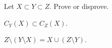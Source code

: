 \item Let $X \subset Y \subset Z$. Prove or disprove.
\ba
\item $C_Y(X) \subset C_Z(X)$.

\item $Z \setminus (Y \setminus X) = X \cup (Z \setminus Y)$. 


\ea

\begin{comment}

\ExerciseSolution

\ba
\item  To prove this containment, we choose an arbitrary element from $C_Y(X)$ and show that the element is also in $C_Z(X)$. Suppose $t \in C_Y(X)$. Then $t \in Y$ but $t \not\in X$. Since $Y \subset Z$, it follows that $t \in Z$. So $t \in Z$ but $t \notin X$. This means $t \in C_Z(X)$. We conclude that $C_Y(X) \subset C_Z(X)$.

\item  To prove $Z \setminus (Y \setminus X) \subseteq X \cup (Z \setminus Y)$, suppose that $t \in Z \setminus (Y \setminus X)$. By definition, $t \in Z$ but $t \notin (Y\setminus X)$. So $t \in X$ or $t \notin Y$. This gives us two possibilities: $t \in Z$ and $t \in X$ or $t \in Z$ and $t \notin Y$. 
\begin{itemize}
\item If $t \in X$ and $t \in Z$, then $X \subset Z$ implies $t \in X$. 
\item If $t \in Z$ and $t \notin Y$, then $t \in Z\setminus Y$. 
\end{itemize}
Thus, we either have $t \in X$ or $t \in Z\setminus Y$. This is the same as saying $t \in X \cup (Z\setminus Y)$. So  $Z \setminus (Y\setminus X) \subseteq X \cup (Z\setminus Y)$.

For the reverse containment, suppose $t \in X \cup (Z\setminus Y)$. Then $t \in X$ or $t \in Z\setminus Y$. We consider the cases.  
\begin{itemize}
\item Suppose $t \in X$. Then $X \subseteq Z$ implies $t \in Z$. The fact that $t \in X$ means that $t \notin Y\setminus X$. Thus, $t \in Z \setminus (Y\setminus X)$.
\item Now suppose that $t \in Z\setminus Y$. Since $Z\setminus Y \subseteq Z$, it follows that $t \in Z$. The facts that $Y\setminus X \subseteq Y$ and $t \notin Y$ also show that $t \notin Y\setminus X$. Thus, $t \in Z \setminus (Y\setminus X)$. 
\end{itemize}
In either case we have $t \in Z \setminus (Y\setminus X)$, and so $X \cup (Z\setminus Y) \subseteq Z \setminus (Y\setminus X)$. The two containments combine to verify that $Z \setminus (Y\setminus X) = X \cup (Z\setminus Y)$.

\ea

\end{comment}


